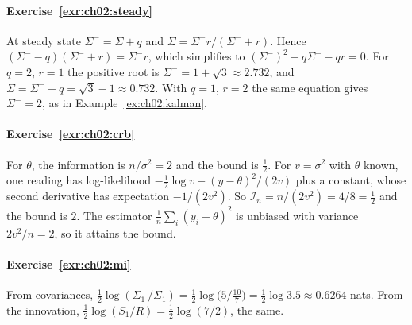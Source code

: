 \paragraph{Exercise~\ref{exr:ch02:steady}}
At steady state $\Sigma^-=\Sigma+q$ and $\Sigma=\Sigma^-r/(\Sigma^-+r)$. Hence
$(\Sigma^--q)(\Sigma^-+r)=\Sigma^-r$, which simplifies to
$(\Sigma^-)^2-q\Sigma^--qr=0$. For $q=2$, $r=1$ the positive root is
$\Sigma^-=1+\sqrt3\approx2.732$, and $\Sigma=\Sigma^--q=\sqrt3-1\approx0.732$.
With $q=1$, $r=2$ the same equation gives $\Sigma^-=2$, as in Example~\ref{ex:ch02:kalman}.

\paragraph{Exercise~\ref{exr:ch02:crb}}
For $\theta$, the information is $n/\sigma^2=2$ and the bound is $\tfrac12$.
For $v=\sigma^2$ with $\theta$ known, one reading has log-likelihood
$-\tfrac12\log v-(y-\theta)^2/(2v)$ plus a constant, whose second derivative has
expectation $-1/(2v^2)$. So $\mathcal I_n=n/(2v^2)=4/8=\tfrac12$ and the bound
is $2$. The estimator $\tfrac1n\sum_i(y_i-\theta)^2$ is unbiased with variance
$2v^2/n=2$, so it attains the bound.

\paragraph{Exercise~\ref{exr:ch02:mi}}
From covariances, $\tfrac12\log(\Sigma_1^-/\Sigma_1)=\tfrac12\log\big(5\big/\tfrac{10}7\big)=\tfrac12\log3.5\approx0.6264$
nats. From the innovation, $\tfrac12\log(S_1/R)=\tfrac12\log(7/2)$, the same.
